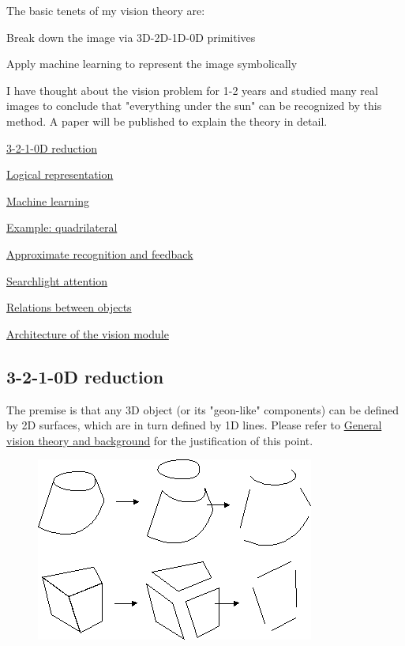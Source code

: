 The basic tenets of my vision theory are:
\begin{compactenum-}
	\item  Break down the image via 3D-2D-1D-0D primitives
	\item  Apply  machine learning to represent the image symbolically
\end{compactenum-}

I have thought about the vision problem for 1-2 years and studied many real images to conclude that "everything under the sun" can be recognized by this method. A  paper will be published to explain the theory in detail.
\underconst
\begin{compactenum-}
	\item \hyperlink{3210DReduction}{3-2-1-0D reduction}
	\item \hyperlink{LogicalRepresentation}{Logical representation}
	\item \hyperlink{MachineLearning}{Machine learning}
	\item \hyperlink{Example}{Example: quadrilateral}
	\item \hyperlink{ApproximateRecognition}{Approximate recognition and feedback}
	\item \hyperlink{Attention}{Searchlight attention}
	\item \hyperlink{Relations}{Relations between objects}
	\item \hyperlink{Architecture}{Architecture of the vision module}
\end{compactenum-}

\subsection{3-2-1-0D reduction}

The premise is that any 3D object (or its "geon-like" components) can be defined by  2D surfaces, which are in turn defined by 1D lines. Please refer to \href{Vis-Background.htm}{General vision theory and background} for the justification of this point.

\begin{figure}[H]
\centering
\includegraphics[scale=0.6]{PolygonDecomposition.PNG}
\end{figure}

